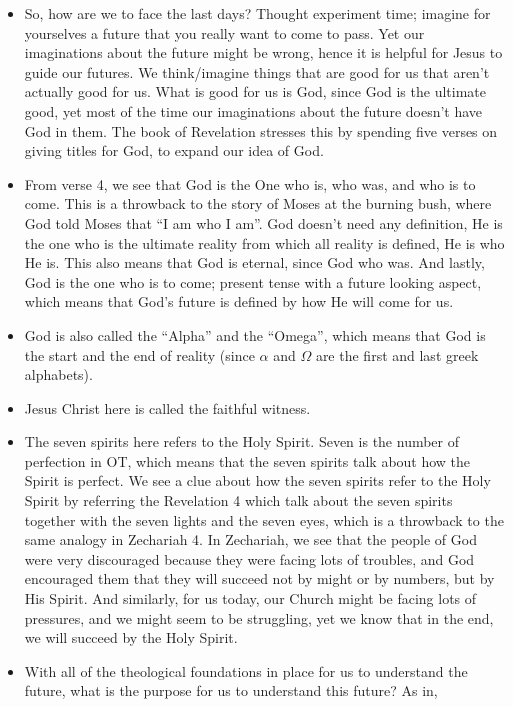 \begin{itemize}
  \item{So, how are we to face the last days?  Thought experiment time;
  imagine for yourselves a future that you really want to come to pass.  Yet
  our imaginations about the future might be wrong, hence it is helpful for
  Jesus to guide our futures.  We think/imagine things that are good for us
  that aren't actually good for us.  What is good for us is God, since God is
  the ultimate good, yet most of the time our imaginations about the future
  doesn't have God in them.  The book of Revelation stresses this by spending
  five verses on giving titles for God, to expand our idea of God.}
  \item{ From verse 4, we see that God is the One who is, who was, and who is
  to come.  This is a throwback to the story of Moses at the burning bush,
  where God told Moses that ``I am who I am''.  God doesn't need any
  definition, He is the one who is the ultimate reality from which all
  reality is defined, He is who He is.  This also means that God is eternal,
  since God who was.  And lastly, God is the one who is to come; present
  tense with a future looking aspect, which means that God's future is
  defined by how He will come for us.}
  \item{God is also called the ``Alpha'' and the ``Omega'', which means that God is the start and the end of reality (since $\alpha$ and $\Omega$ are the first and last greek alphabets).}
  \item{Jesus Christ here is called the faithful witness. }
  \item{The seven spirits here refers to the Holy Spirit.  Seven is the
  number of perfection in OT, which means that the seven spirits talk about
  how the Spirit is perfect.  We see a clue about how the seven spirits refer
  to the Holy Spirit by referring the Revelation 4 which talk about the seven
  spirits together with the seven lights and the seven eyes, which is a
  throwback to the same analogy in Zechariah 4.  In Zechariah, we see that
  the people of God were very discouraged because they were facing lots of
  troubles, and God encouraged them that they will succeed not by might or by
  numbers, but by His Spirit.  And similarly, for us today, our Church might
  be facing lots of pressures, and we might seem to be struggling, yet we
  know that in the end, we will succeed by the Holy Spirit.}
  \item{With all of the theological foundations in place for us to understand
  the future, what is the purpose for us to understand this future?  As in,
}
\end{itemize}
